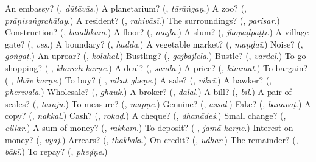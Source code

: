 \begin{tcolorbox}[breakable,colback=teal!4,colframe=teal!35!black,title={Before you move on}]
An embassy? (\textbf{}, \emph{dūtāvās}.) A planetarium? (\textbf{}, \emph{tārāṅgaṇ}.) A zoo? (\textbf{}, \emph{prāṇisaṅgrahālay}.) A resident? (\textbf{}, \emph{rahivāsī}.) The surroundings? (\textbf{}, \emph{parisar}.) Construction? (\textbf{}, \emph{bāndhkām}.) A floor? (\textbf{}, \emph{majlā}.) A slum? (\textbf{}, \emph{jhopaḍpaṭṭī}.) A village gate? (\textbf{}, \emph{ves}.) A boundary? (\textbf{}, \emph{hadda}.) A vegetable market? (\textbf{}, \emph{maṇḍaī}.) Noise? (\textbf{}, \emph{goṅgāṭ}.) An uproar? (\textbf{}, \emph{kolāhal}.) Bustling? (\textbf{}, \emph{gajbajlelā}.) Bustle? (\textbf{}, \emph{vardaḷ}.) To go shopping? (\textbf{ }, \emph{kharedī karṇe}.) A deal? (\textbf{}, \emph{saudā}.) A price? (\textbf{}, \emph{kimmat}.) To bargain? (\textbf{ }, \emph{bhāv karṇe}.) To buy? (\textbf{ }, \emph{vikat gheṇe}.) A sale? (\textbf{}, \emph{vikrī}.) A hawker? (\textbf{}, \emph{pherīvālā}.) Wholesale? (\textbf{}, \emph{ghāūk}.) A broker? (\textbf{}, \emph{dalāl}.) A bill? (\textbf{}, \emph{bil}.) A pair of scales? (\textbf{}, \emph{tarājū}.) To measure? (\textbf{}, \emph{māpṇe}.) Genuine? (\textbf{}, \emph{assal}.) Fake? (\textbf{}, \emph{banāvaṭ}.) A copy? (\textbf{}, \emph{nakkal}.) Cash? (\textbf{}, \emph{rokaḍ}.) A cheque? (\textbf{}, \emph{dhanādeś}.) Small change? (\textbf{}, \emph{cillar}.) A sum of money? (\textbf{}, \emph{rakkam}.) To deposit? (\textbf{ }, \emph{jamā karṇe}.) Interest on money? (\textbf{}, \emph{vyāj}.) Arrears? (\textbf{}, \emph{thakbākī}.) On credit? (\textbf{}, \emph{udhār}.) The remainder? (\textbf{}, \emph{bākī}.) To repay? (\textbf{}, \emph{pheḍṇe}.)
\end{tcolorbox}
